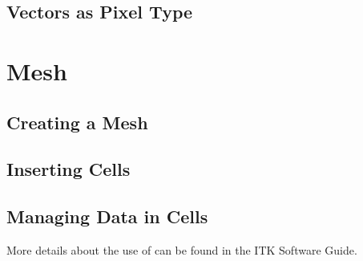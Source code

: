\subsection{Vectors as Pixel Type}
\label{sec:PointSetWithVectorsAsPixelType}






%




\section{Mesh}\label{MeshSection}

\subsection{Creating a Mesh}
\label{sec:CreatingAMesh}




\subsection{Inserting Cells}
\label{sec:InsertingCellsInMesh}




\subsection{Managing Data in Cells}
\label{sec:ManagingCellDataInMesh}




More details about the use of  can be found in the
ITK Software Guide.


%



